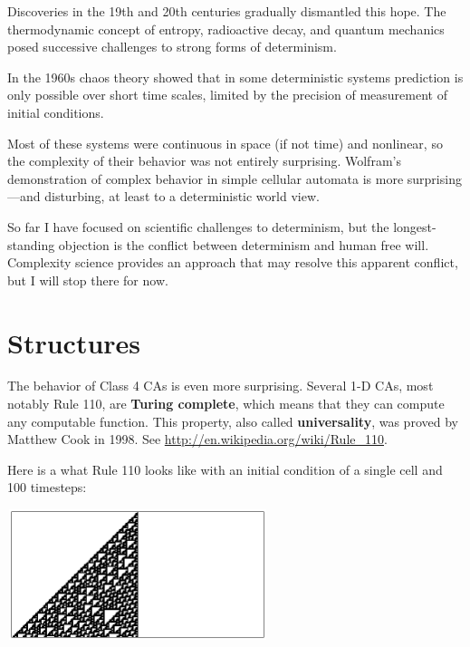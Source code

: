 \documentclass[10pt]{book}
\begin{document}
Discoveries in the 19th and 20th centuries gradually dismantled
this hope.  The thermodynamic concept of entropy, radioactive decay,
and quantum mechanics posed successive challenges to strong
forms of determinism.

In the 1960s chaos theory showed that in some deterministic systems
prediction is only possible over short time scales,  limited by
the precision of measurement of initial conditions.

Most of these systems were continuous in space (if not time) and
nonlinear, so the complexity of their behavior was not entirely
surprising.  Wolfram's demonstration of complex behavior in simple
cellular automata is more surprising---and disturbing, at least to a
deterministic world view.

So far I have focused on scientific challenges to determinism, but the
longest-standing objection is the conflict between
determinism and human free will.  Complexity science provides
an approach that may resolve this apparent conflict, but I
will stop there for now.


\section{Structures}

The behavior of Class 4 CAs is even more surprising.  Several 1-D CAs,
most notably Rule 110, are {\bf Turing complete}, which means that
they can compute any computable function.  This property, also called
{\bf universality}, was proved by Matthew Cook in 1998.  See
\url{http://en.wikipedia.org/wiki/Rule_110}.

Here is a what Rule 110 looks like with an initial condition of
a single cell and 100 timesteps:

\beforefig
\centerline{\includegraphics[width=3.0in,height=1.5in]{figs/rule110.eps}}
\afterfig
\end{document}
